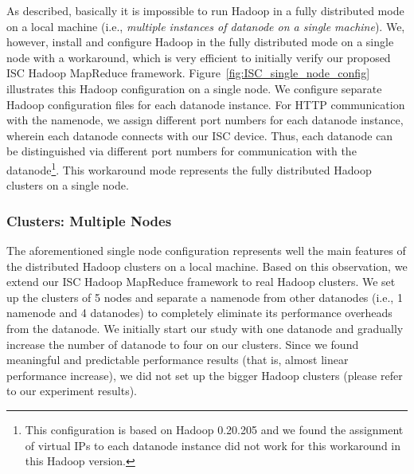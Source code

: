 As described, basically it is impossible to run Hadoop in a fully distributed mode on a local machine (i.e., \emph{multiple instances of datanode on a single machine}). We, however, install and configure Hadoop in the fully distributed mode on a single node with a workaround, which is very efficient to initially verify our proposed ISC Hadoop MapReduce framework. Figure~\ref{fig:ISC_single_node_config} illustrates this Hadoop configuration on a single node. We configure separate Hadoop configuration files for each datanode instance. For HTTP communication with the namenode, we assign different port numbers for each datanode instance, wherein each datanode connects with our ISC device. Thus, each datanode can be distinguished via different port numbers for communication with the datanode\footnote{\small This configuration is based on Hadoop 0.20.205 and we found the assignment of virtual IPs to each datanode instance did not work for this workaround in this Hadoop version.}. This workaround mode represents the fully distributed Hadoop clusters on a single node.



\subsubsection{Clusters: Multiple Nodes}\label{sec:multinodes}
The aforementioned single node configuration represents well the main features of the distributed Hadoop clusters on a local machine. Based on this observation, we extend our ISC Hadoop MapReduce framework to real Hadoop clusters. We set up the clusters of 5 nodes and separate a namenode from other datanodes (i.e., 1 namenode and 4 datanodes) to completely eliminate its performance overheads from the datanode. We initially start our study with one datanode and gradually increase the number of datanode to four on our clusters. Since we found meaningful and predictable performance results (that is, almost linear performance increase), we did not set up the bigger Hadoop clusters (please refer to our experiment results).


